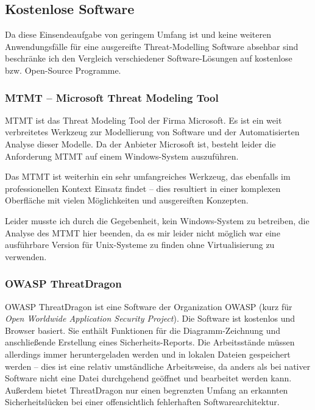 \documentclass{article}
\begin{document}
\subsection*{Kostenlose Software}

Da diese Einsendeaufgabe von geringem Umfang ist und keine weiteren Anwendungsfälle für 
eine ausgereifte Threat-Modelling Software absehbar sind beschränke ich den Vergleich 
verschiedener Software-Lösungen auf kostenlose bzw. Open-Source Programme.

\subsubsection*{MTMT – Microsoft Threat Modeling Tool}

MTMT ist das Threat Modeling Tool der Firma Microsoft. Es ist ein weit verbreitetes 
Werkzeug zur Modellierung von Software und der Automatisierten Analyse dieser Modelle. Da 
der Anbieter Microsoft ist, besteht leider die Anforderung MTMT auf einem Windows-System 
auszuführen.

Das MTMT ist weiterhin ein sehr umfangreiches Werkzeug, das ebenfalls im professionellen 
Kontext Einsatz findet – dies resultiert in einer komplexen Oberfläche mit 
vielen Möglichkeiten und ausgereiften Konzepten.

Leider musste ich durch die Gegebenheit, kein Windows-System zu betreiben, die Analyse 
des MTMT hier beenden, da es mir leider nicht möglich war eine ausführbare Version für 
Unix-Systeme zu finden ohne Virtualisierung zu verwenden.

\subsubsection*{OWASP ThreatDragon}

OWASP ThreatDragon ist eine Software der Organization OWASP (kurz für \textit{Open 
Worldwide Application Security Project}). Die Software ist kostenlos und
Browser basiert. Sie enthält Funktionen für die Diagramm-Zeichnung und anschließende 
Erstellung eines Sicherheits-Reports. Die Arbeitsstände müssen allerdings immer 
heruntergeladen werden und in lokalen Dateien gespeichert werden – dies ist eine relativ 
umständliche Arbeitsweise, da anders als bei nativer Software nicht eine Datei durchgehend 
geöffnet und bearbeitet werden kann. Außerdem bietet ThreatDragon nur einen begrenzten 
Umfang an erkannten Sicherheitslücken bei einer offensichtlich fehlerhaften 
Softwarearchitektur.
\end{document}
